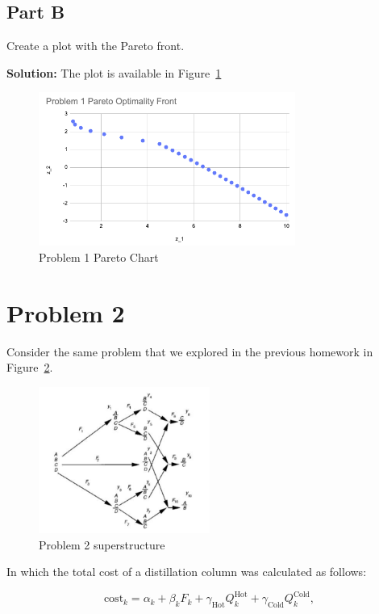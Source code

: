 \documentclass[11pt]{article}
\begin{document}
\subsection{Part B}
Create a plot with the Pareto front.

\textbf{Solution:} 
The plot is available in Figure~\ref{fig:prob1_pareto}

\begin{figure}[htbp]
  \centerline{\includegraphics[width=0.75\textwidth]{images/prob1_pareto.png}}
  \caption{Problem 1 Pareto Chart}
  \label{fig:prob1_pareto}
\end{figure}

\section{Problem 2}
Consider the same problem that we explored in the previous homework in Figure~\ref{fig:prob2_superstructure}.

\begin{figure}[htbp]
  \centerline{\includegraphics[width=0.50\textwidth]{images/prob2_superstructure.png}}
  \caption{Problem 2 superstructure}
  \label{fig:prob2_superstructure}
\end{figure}

In which the total cost of a distillation column was calculated as follows:

\[
\text{cost}_k = \alpha_k + \beta_k F_k + \gamma_{\text{Hot}} Q_k^{\text{Hot}} + \gamma_{\text{Cold}} Q_k^{\text{Cold}},
\]
\end{document}
